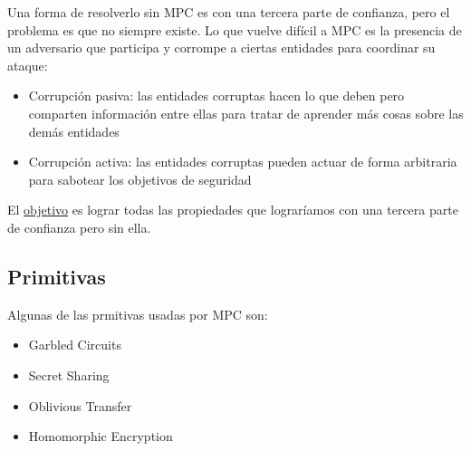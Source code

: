   Una forma de resolverlo sin MPC es con una tercera parte de confianza, pero el 
  problema es que no siempre existe.
  Lo que vuelve difícil a MPC es la presencia de un adversario 
  que participa y corrompe a ciertas entidades para coordinar su ataque:
  \begin{itemize}
    \item Corrupción pasiva: las entidades corruptas hacen lo que deben pero comparten 
      información entre ellas para tratar de aprender más cosas sobre las demás entidades 
    \item Corrupción activa: las entidades corruptas pueden actuar de forma arbitraria 
      para sabotear los objetivos de seguridad
  \end{itemize}
  El \underline{objetivo} es lograr todas las propiedades que lograríamos con una tercera 
  parte de confianza pero sin ella.

  \subsection{Primitivas}
  Algunas de las prmitivas usadas por MPC son:
  \begin{itemize}
    \item Garbled Circuits
    \item Secret Sharing 
    \item Oblivious Transfer 
    \item Homomorphic Encryption
  \end{itemize}

